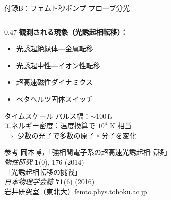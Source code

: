 \documentclass[12pt,aspectratio=169]{beamer}
\begin{document}
\begin{frame}[shrink=15]{付録B：フェムト秒ポンプ-プローブ分光}
\begin{columns}[T]
    \begin{column}{0.47\textwidth}
      \textbf{観測される現象（光誘起相転移）：}
      \begin{itemize}
        \item 光誘起絶縁体—金属転移
        \item 光誘起中性—イオン性転移
        \item 超高速磁性ダイナミクス
        \item ペタヘルツ固体スイッチ
      \end{itemize}

      \smallskip
      \begin{block}{\small タイムスケール}
        \small
        パルス幅：$\sim100\,\mathrm{fs}$\\
        エネルギー密度：温度換算で $10^4$ K 相当\\
        $\Rightarrow$ 少数の光子で多数の原子・分子を変化
      \end{block}

      \smallskip
      \begin{block}{\small 参考}
        \small
        岡本博，「強相関電子系の超高速光誘起相転移」\\
        \textit{物性研究} \textbf{1}(0), 176 (2014)\\[2pt]
        「光誘起相転移の挑戦」\\
        \textit{日本物理学会誌} \textbf{71}(6) (2016)\\[2pt]
        岩井研究室（東北大）\url{femto.phys.tohoku.ac.jp}
      \end{block}
    \end{column}
  \end{columns}
\end{frame}
\end{document}
